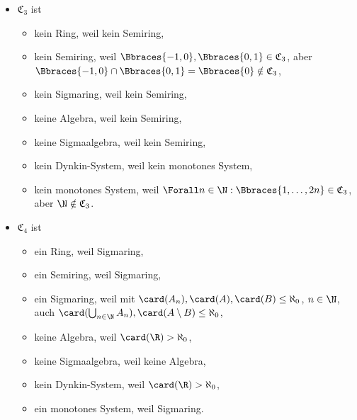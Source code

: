 \begin{solution}
\begin{itemize}
  \item $\mathfrak{C}_3$ ist
  \begin{itemize}
    \item kein Ring, weil kein Semiring,
    \item kein Semiring, weil $\Bbraces{-1, 0}, \Bbraces{0, 1} \in \mathfrak{C}_3$, aber $\Bbraces{-1, 0} \cap \Bbraces{0, 1} = \Bbraces{0} \notin \mathfrak{C}_3$,
    \item kein Sigmaring, weil kein Semiring,
    \item keine Algebra, weil kein Semiring,
    \item keine Sigmaalgebra, weil kein Semiring,
    \item kein Dynkin-System, weil kein monotones System,
    \item kein monotones System, weil $\Forall n \in \N: \Bbraces{1, \ldots, 2n} \in \mathfrak{C}_3$, aber $\N \notin \mathfrak{C}_3$.
  \end{itemize}

  \item $\mathfrak{C}_4$ ist
  \begin{itemize}
    \item ein Ring, weil Sigmaring,
    \item ein Semiring, weil Sigmaring,
    \item ein Sigmaring, weil mit $\card(A_n), \card(A), \card(B) \leq \aleph_0$, $n \in \N$, auch $\card(\bigcup_{n \in \N} A_n), \card(A \setminus B) \leq \aleph_0$,
    \item keine Algebra, weil $\card(\R) > \aleph_0$,
    \item keine Sigmaalgebra, weil keine Algebra,
    \item kein Dynkin-System, weil $\card(\R) > \aleph_0$,
    \item ein monotones System, weil Sigmaring.
  \end{itemize}

\end{itemize}

\end{solution}
